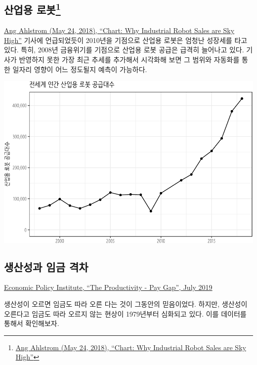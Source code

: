 \documentclass[smallextended]{svjour3}       %
\begin{document}
\hypertarget{industrial-robot}{%
\subsection[산업용 로봇]{\texorpdfstring{산업용
로봇\footnote{\href{https://www.visualcapitalist.com/industrial-robot-sales-sky-high/}{Ang
  Ahlstrom (May 24, 2018), ``Chart: Why Industrial Robot Sales are Sky
  High''}}}{산업용 로봇}}\label{industrial-robot}}

\href{https://www.visualcapitalist.com/industrial-robot-sales-sky-high/}{Ang
Ahlstrom (May 24, 2018), ``Chart: Why Industrial Robot Sales are Sky
High''} 기사에 언급되었듯이 2010년을 기점으로 산업용 로봇은 엄청난
성장세를 타고 있다. 특히, 2008년 금융위기를 기점으로 산업용 로봇 공급은
급격히 늘어나고 있다. 기사가 반영하지 못한 가장 최근 추세를 추가해서
시각화해 보면 그 범위와 자동화를 통한 일자리 영향이 어느 정도될지 예측이
가능하다.

\begin{center}\includegraphics{paper_files/figure-latex/industrial-robot-1} \end{center}

\hypertarget{wage-productivity-gap}{%
\subsection{생산성과 임금 격차}\label{wage-productivity-gap}}

\href{https://www.epi.org/productivity-pay-gap/}{Economic Policy
Institute, ``The Productivity - Pay Gap'', July 2019}

생산성이 오르면 임금도 따라 오른 다는 것이 그동안의 믿음이었다. 하지만,
생산성이 오른다고 임금도 따라 오르지 않는 현상이 1979년부터 심화되고
있다. 이를 데이터를 통해서 확인해보자.
\end{document}
